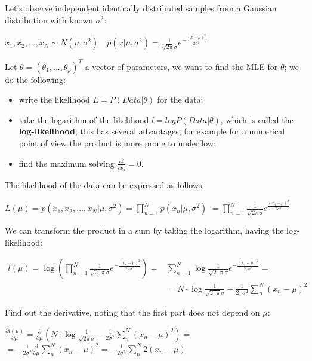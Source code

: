 Let's observe independent identically distributed samples from a Gaussian distribution with known $\sigma^2$:
\begin{center}
    $x_{1}, x_{2}, \ldots, x_{N} \sim N\left(\mu, \sigma^{2}\right) \quad p\left(x | \mu, \sigma^{2}\right)=\frac{1}{\sqrt{2 \pi} \sigma} e^{-\frac{(x-\mu)^{2}}{2 \sigma^{2}}}$  
\end{center}
Let $\theta = (\theta_1,...,\theta_p)^T$ a vector of parameters, we want to find the MLE for $\theta$; we do the following:
\begin{itemize}
    \item write the likelihood $L=P(Data|\theta)$ for the data;
    \item take the logarithm of the likelihood $l=logP(Data|\theta)$, which is called the \textbf{log-likelihood}; this has several advantages, for example for a numerical point of view the product is more prone to underflow;
    \item find the maximum solving $\frac{\partial l}{\partial\theta_i}=0$.
\end{itemize}
The likelihood of the data can be expressed as follows:
\begin{center}
    $L(\mu)=p\left(x_{1}, x_{2}, \ldots, x_{N} | \mu, \sigma^{2}\right)=\prod_{n=1}^{N} p\left(x_{n} | \mu, \sigma^{2}\right)$
$=\prod_{n=1}^{N} \frac{1}{\sqrt{2 \pi} \sigma} e^{\frac{\left(x_{n}-\mu\right)^{2}}{2 \sigma^{2}}}$   
\end{center}
We can transform the product in a sum by taking the logarithm, having the log-likelihood:
\begin{center}
    $\begin{aligned} l(\mu)=\log \left(\prod_{n=1}^{N} \frac{1}{\sqrt{2 \cdot \pi} \sigma} e^{-\frac{\left(x_{n}-\mu\right)^{2}}{2 \cdot \sigma^{2}}}\right)=& \sum_{n=1}^{N} \log \frac{1}{\sqrt{2 \cdot \pi} \sigma} e^{-\frac{\left(x_{n}-\mu\right)^{2}}{2 \cdot \sigma^{2}}}=\\ &=N \cdot \log \frac{1}{\sqrt{2 \cdot \pi} \sigma}-\frac{1}{2 \cdot \sigma^{2}} \sum_{n}^{N}\left(x_{n}-\mu\right)^{2} \end{aligned}$   
\end{center}
Find out the derivative, noting that the first part does not depend on $\mu$:
\begin{center}
    $\frac{\partial l(\mu)}{\partial \mu}=\frac{\partial}{\partial \mu}\left(N \cdot \log \frac{1}{\sqrt{2 \pi} \sigma}-\frac{1}{2 \sigma^{2}} \sum_{n}^{N}\left(x_{n}-\mu\right)^{2}\right)=$
$=-\frac{1}{2 \sigma^{2}} \frac{\partial}{\partial \mu} \sum_{n}^{N}\left(x_{n}-\mu\right)^{2}=-\frac{1}{2 \sigma^{2}} \sum_{n}^{N} 2\left(x_{n}-\mu\right)$
\end{center}

